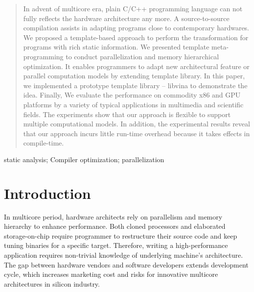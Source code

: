 \documentclass[10pt, conference, compsocconf]{IEEEtran}
\begin{document}
\begin{abstract}
In advent of multicore era, plain C/C++ programming language can not fully reflects the hardware architecture any more. A source-to-source compilation assists in adapting programs close to contemporary hardwares. We proposed a template-based approach to perform the transformation for programs with rich static information. We presented template meta-programming to conduct parallelization and memory hierarchical optimization. It enables programmers to adapt new architectural feature or parallel computation models by extending template library. 
In this paper, we implemented a prototype template library -- libvina to demonstrate the idea. Finally, We evaluate the performance on commodity x86 and GPU platforms by a variety of typical applications in multimedia and scientific fields. The experiments show that our approach is flexible to support multiple computational models. In addition, the experimental results reveal that our approach incurs little run-time overhead because it takes effects in compile-time.
\end{abstract}

\begin{IEEEkeywords}
static analysis; Compiler optimization; parallelization
\end{IEEEkeywords}


%
\IEEEpeerreviewmaketitle

\section{Introduction}
In multicore period, hardware architects rely on parallelism and memory hierarchy to enhance performance. Both cloned processors and elaborated storage-on-chip require programmer to restructure their source code and keep tuning binaries for a specific target. Therefore, writing a high-performance application requires non-trivial knowledge of underlying machine's architecture. The gap between hardware vendors and software developers extends development cycle, which increases marketing cost and risks for innovative multicore architectures in silicon industry.
\end{document}
